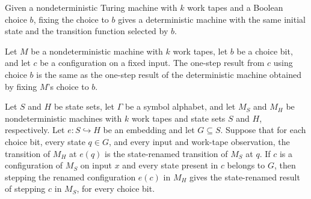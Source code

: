 \begin{definition}
\label{Turing.NDTM.fixChoice}
\leanok
{}
Given a nondeterministic Turing machine with $k$ work tapes and a Boolean choice $b$,
fixing the choice to $b$ gives a deterministic machine with the same initial state and
the transition function selected by $b$.
\end{definition}

\begin{theorem}
\label{Turing.NDTM.stepWith_eq_fixChoice_step}
\leanok
{}
Let $M$ be a nondeterministic machine with $k$ work tapes, let $b$ be a choice bit, and
let $c$ be a configuration on a fixed input. The one-step result from $c$ using choice
$b$ is the same as the one-step result of the deterministic machine obtained by fixing
$M$'s choice to $b$.
\end{theorem}

\begin{theorem}
\label{Turing.NDTM.stepWith_mapState_of_agreeOn}
\leanok
{}
Let $S$ and $H$ be state sets, let $\Gamma$ be a symbol alphabet, and let $M_S$ and
$M_H$ be nondeterministic machines with $k$ work tapes and state sets $S$ and $H$,
respectively. Let $e:S\hookrightarrow H$ be an embedding and let $G\subseteq S$. Suppose
that for each choice bit, every state $q\in G$, and every input and work-tape
observation, the transition of $M_H$ at $e(q)$ is the state-renamed transition of $M_S$
at $q$. If $c$ is a configuration of $M_S$ on input $x$ and every state present in $c$
belongs to $G$, then stepping the renamed configuration $e(c)$ in $M_H$ gives the
state-renamed result of stepping $c$ in $M_S$, for every choice bit.
\end{theorem}

